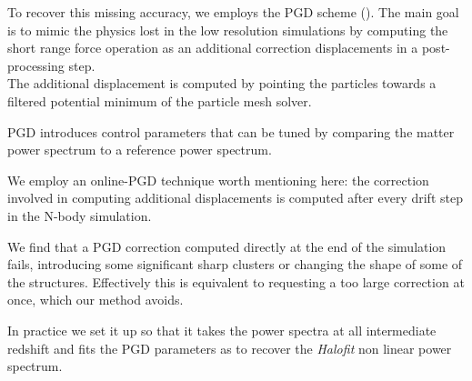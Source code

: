 \documentclass[twocolumn,twocolappendix]{aastex63}
\begin{document}
To recover this missing accuracy, we employs the PGD scheme (\cite{Dai_2018}). 
The main goal is to mimic the physics lost in the low resolution simulations by computing the short range force operation as an additional correction displacements in a post-processing step. \\
The additional displacement is computed by pointing the particles towards a filtered potential minimum of the particle mesh solver.


PGD introduces control parameters that can be tuned by comparing the matter power spectrum to a reference power spectrum. 


We employ an online-PGD technique worth mentioning here: the correction involved in computing additional displacements is computed after every drift step in the N-body simulation. 


We find that a PGD correction computed directly at the end of the simulation fails, introducing some significant sharp clusters or changing the shape of some of the structures. Effectively this is equivalent to requesting a too large correction at once, which our method avoids.

In practice we set it up so that it takes the power spectra at all intermediate redshift and fits the PGD parameters as to recover the \textit{Halofit} non linear power spectrum.
\end{document}
